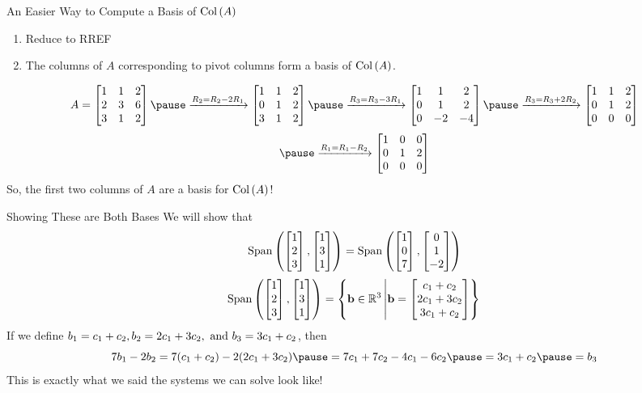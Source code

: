 \documentclass[xcoler=dvipsnames, aspectratio=169]{beamer}
\begin{document}
    \begin{frame}{An Easier Way to Compute a Basis of $\mathrm{Col}\left(A\right)$}
        \begin{enumerate}
            \item Reduce to RREF
            \item The columns of $A$ corresponding to pivot columns form a basis of $\mathrm{Col}\left(A\right)$.
        \end{enumerate}
        \begin{example}
            \[
                A = \bMat{
                    1 & 1 & 2\\
                    2 & 3 & 6\\
                    3 & 1 & 2
                }\pause\xrightarrow{R_2=R_2-2R_1}\bMat{
                    1 & 1 & 2\\
                    0 & 1 & 2\\
                    3 & 1 & 2
                }\pause\xrightarrow{R_3=R_3-3R_1}\bMat{
                    1 & 1 & 2\\
                    0 & 1 & 2\\
                    0 &-2 &-4
                }\pause\xrightarrow{R_3=R_3+2R_2}\bMat{
                    1 & 1 & 2\\
                    0 & 1 & 2\\
                    0 & 0 & 0
                }
            \]
            \[
                \pause\xrightarrow{R_1=R_1-R_2}\bMat{
                    1 & 0 & 0\\
                    0 & 1 & 2\\
                    0 & 0 & 0
                }
            \]
            So, the first two columns of $A$ are a basis for $\mathrm{Col}\left(A\right)$!
        \end{example}
    \end{frame}
    \begin{frame}{Showing These are Both Bases}
        We will show that
        \[
            \text{Span}\left(\begin{bmatrix}1\\2\\3\end{bmatrix},\begin{bmatrix}1\\3\\1\end{bmatrix}\right) = \text{Span}\left(\begin{bmatrix}1\\0\\7\end{bmatrix},\begin{bmatrix}0\\1\\-2\end{bmatrix}\right)
        \]\pause
        \[
            \text{Span}\left(\begin{bmatrix}1\\2\\3\end{bmatrix},\begin{bmatrix}1\\3\\1\end{bmatrix}\right) = \left\{\mathbf{b}\in\mathbb{R}^3\left|\mathbf{b}=
            \begin{bmatrix}c_1+c_2\\2c_1+3c_2\\3c_1+c_2\end{bmatrix}\right\}\right.
        \]\pause
        If we define $b_1=c_1+c_2, b_2=2c_1+3c_2,\textnormal{ and } b_3=3c_1+c_2$, then\pause
        \[
            7b_1 - 2b_2 = 7(c_1+c_2)-2(2c_1+3c_2)\pause =7c_1+7c_2-4c_1-6c_2\pause = 3c_1+c_2\pause = b_3
        \]\pause
        This is exactly what we said the systems we can solve look like!
    \end{frame}
\end{document}
